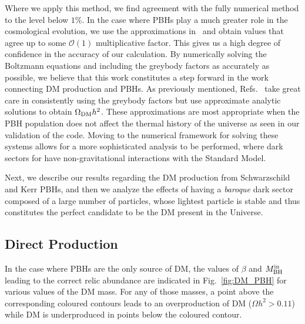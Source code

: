 \documentclass[aps,prd,reprint,twocolumn,preprintnumbers,floatfix,nofootinbib]{revtex4-1}
\newcommand{\MBHi}{M_{\rm BH}^{\rm in}}
\begin{document}
Where we apply this method, we find agreement with the fully numerical method to the level below $1\%$. In the case where PBHs play a much greater role in the cosmological evolution, we use the approximations in~\cite{paperB} and obtain values that agree up to some $\mathcal{O}(1)$ multiplicative factor. This gives us a high degree of confidence in the accuracy of our calculation. By numerically solving the Boltzmann equations and including the greybody factors as accurately as possible, we believe that this work constitutes a step forward in the work connecting DM production and PBHs. As previously mentioned, Refs.~\cite{Auffinger:2020afu, Masina:2021zpu} take great care in consistently using the greybody factors but use approximate analytic solutions to obtain $\Omega_{\rm DM}h^2$. These approximations are most appropriate when the PBH population does not affect the thermal history of the universe as seen in our validation of the code. Moving to the numerical framework for solving these systems allows for a more sophisticated analysis to be performed, where dark sectors for have non-gravitational interactions with the Standard Model. 

Next, we describe our results regarding the DM production from Schwarzschild and Kerr PBHs, and then we analyze the effects of having a \emph{baroque} dark sector composed of a large number of particles, whose lightest particle is stable and thus constitutes the perfect candidate to be the DM present in the Universe.

\subsection{Direct Production}

In the case where PBHs are the only source of DM, the values of $\beta$ and $\MBHi$ leading to the correct relic abundance are indicated in Fig.~\ref{fig:DM_PBH} for various values of the DM mass. For any of those masses, a point above the corresponding coloured contours leads to an overproduction of DM ($\Omega h^2 > 0.11$) while DM is underproduced in points below the coloured contour.
\end{document}
